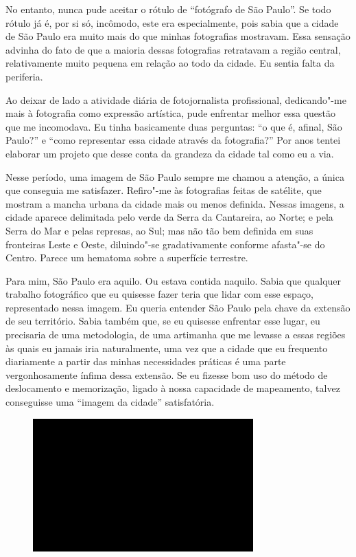 No entanto, nunca pude aceitar o rótulo de ``fotógrafo de São Paulo''.
Se todo rótulo já é, por si só, incômodo, este era especialmente, pois
sabia que a cidade de São Paulo era muito mais do que minhas fotografias
mostravam. Essa sensação advinha do fato de que a maioria dessas
fotografias retratavam a região central, relativamente muito pequena em
relação ao todo da cidade. Eu sentia falta da periferia.

Ao deixar de lado a atividade diária de fotojornalista profissional,
dedicando"-me mais à fotografia como expressão artística, pude enfrentar
melhor essa questão que me incomodava. Eu tinha basicamente duas
perguntas: ``o que é, afinal, São Paulo?'' e ``como representar essa
cidade através da fotografia?'' Por anos tentei elaborar um projeto que
desse conta da grandeza da cidade tal como eu a via.

Nesse período, uma imagem de São Paulo sempre me chamou a atenção, a
única que conseguia me satisfazer. Refiro"-me às fotografias feitas de
satélite, que mostram a mancha urbana da cidade mais ou menos definida.
Nessas imagens, a cidade aparece delimitada pelo verde da Serra da
Cantareira, ao Norte; e pela Serra do Mar e pelas represas, ao Sul; mas
não tão bem definida em suas fronteiras Leste e Oeste, diluindo"-se
gradativamente conforme afasta"-se do Centro. Parece um hematoma sobre a
superfície terrestre.

Para mim, São Paulo era aquilo. Ou estava contida naquilo. Sabia que
qualquer trabalho fotográfico que eu quisesse fazer teria que lidar com
esse espaço, representado nessa imagem. Eu queria entender São Paulo
pela chave da extensão de seu território. Sabia também que, se eu
quisesse enfrentar esse lugar, eu precisaria de uma metodologia, de uma
artimanha que me levasse a essas regiões às quais eu jamais iria
naturalmente, uma vez que a cidade que eu frequento diariamente a
partir das minhas necessidades práticas é uma parte vergonhosamente
ínfima dessa extensão. Se eu fizesse bom uso do método de deslocamento e
memorização, ligado à nossa capacidade de mapeamento, talvez conseguisse
uma ``imagem da cidade'' satisfatória.

\begin{figure}[!ht]

\centering
 \includegraphics[width=85mm]{./imgs/im1.jpg}
\caption{\tiny{}}

\end{figure}

